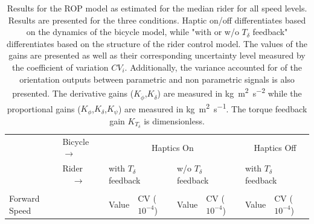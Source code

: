 \begin{table}[]
    \caption{ Results for the ROP model as estimated for the median rider for all speed levels. Results are presented for the three conditions. Haptic on/off differentiates based on the dynamics of the bicycle model, while "with or w/o \ensuremath{T_\delta} feedback" differentiates based on the structure of the rider control model. The values of the gains are presented as well as their corresponding uncertainty level measured by the coefficient of variation \ensuremath{CV_i}. Additionally, the variance accounted for of the orientation outputs between parametric and non parametric signals is also presented. The derivative gains (\ensuremath{K_{\dot{\phi}}},\ensuremath{K_{\dot{\delta}}}) are measured in \si{\kilogram\square\meter\per\square\second} while the proportional gains (\ensuremath{K_{\phi}},\ensuremath{K_{\delta}},\ensuremath{K_{\psi}}) are measured in \si{\kilogram\square\meter\per\second}. The torque feedback gain \ensuremath{K_{T_\delta}} is dimensionless.}
    \label{tb:predict}
    \begin{tabular}{llcccccc}
    \hline
                                                   & Bicycle $\rightarrow$                                  & \multicolumn{4}{c}{Haptics On}                                                                                                                                                                          & \multicolumn{2}{c}{Haptics Off}                                                                    \\ \cline{2-8} 
                                                   & {\color[HTML]{333333} Rider $\;\;\;\;\rightarrow$} & \multicolumn{2}{l}{with $T_\delta$ feedback}                                                       & \multicolumn{2}{l}{w/o  $T_\delta$ feedback}                                                       & \multicolumn{2}{l}{with $T_\delta$ feedback}                                                       \\ \cline{2-8} 
                                                   &                                                        & \multicolumn{1}{l}{}                        & \multicolumn{1}{l}{}                                 & \multicolumn{1}{l}{}                        & \multicolumn{1}{l}{}                                 & \multicolumn{1}{l}{}                        & \multicolumn{1}{l}{}                                 \\
    \multirow{-2}{*}{Forward Speed}                &                                                        & \multicolumn{1}{l}{\multirow{-2}{*}{Value}} & \multicolumn{1}{l}{\multirow{-2}{*}{CV ($10^{-4}$)}} & \multicolumn{1}{l}{\multirow{-2}{*}{Value}} & \multicolumn{1}{l}{\multirow{-2}{*}{CV ($10^{-4}$)}} & \multicolumn{1}{l}{\multirow{-2}{*}{Value}} & \multicolumn{1}{l}{\multirow{-2}{*}{CV ($10^{-4}$)}} \\ \hline

\end{tabular}
\end{table}
